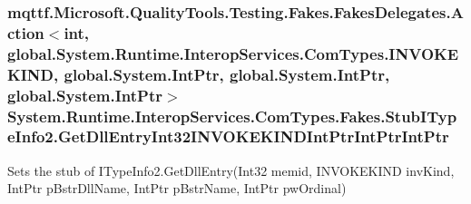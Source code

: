 \hypertarget{class_system_1_1_runtime_1_1_interop_services_1_1_com_types_1_1_fakes_1_1_stub_i_type_info2_a9d2af107df7d2c40f1d9ae34604677c0}{
\subsubsection[{Get\-Dll\-Entry\-Int32\-I\-N\-V\-O\-K\-E\-K\-I\-N\-D\-Int\-Ptr\-Int\-Ptr\-Int\-Ptr}]{\setlength{\rightskip}{0pt plus 5cm}mqttf.\-Microsoft.\-Quality\-Tools.\-Testing.\-Fakes.\-Fakes\-Delegates.\-Action$<$int, global.\-System.\-Runtime.\-Interop\-Services.\-Com\-Types.\-I\-N\-V\-O\-K\-E\-K\-I\-N\-D, global.\-System.\-Int\-Ptr, global.\-System.\-Int\-Ptr, global.\-System.\-Int\-Ptr$>$ System.\-Runtime.\-Interop\-Services.\-Com\-Types.\-Fakes.\-Stub\-I\-Type\-Info2.\-Get\-Dll\-Entry\-Int32\-I\-N\-V\-O\-K\-E\-K\-I\-N\-D\-Int\-Ptr\-Int\-Ptr\-Int\-Ptr}}\label{class_system_1_1_runtime_1_1_interop_services_1_1_com_types_1_1_fakes_1_1_stub_i_type_info2_a9d2af107df7d2c40f1d9ae34604677c0}


Sets the stub of I\-Type\-Info2.\-Get\-Dll\-Entry(\-Int32 memid, I\-N\-V\-O\-K\-E\-K\-I\-N\-D inv\-Kind, Int\-Ptr p\-Bstr\-Dll\-Name, Int\-Ptr p\-Bstr\-Name, Int\-Ptr pw\-Ordinal)

